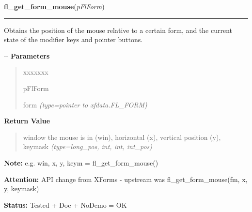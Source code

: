 \hspace{.8\funcindent}\begin{boxedminipage}{\funcwidth}

    \raggedright \textbf{fl\_get\_form\_mouse}(\textit{pFlForm})

    \vspace{-1.5ex}

    \rule{\textwidth}{0.5\fboxrule}
\setlength{\parskip}{2ex}

Obtains the position of the mouse relative to a certain form, and
the current state of the modifier keys and pointer buttons.

-{}-
\setlength{\parskip}{1ex}
      \textbf{Parameters}
      \vspace{-1ex}

      \begin{quote}
        \begin{Ventry}{xxxxxxx}

          \item[pFlForm]


form
            {\it (type=pointer to xfdata.FL\_FORM)}

        \end{Ventry}

      \end{quote}

      \textbf{Return Value}
    \vspace{-1ex}

      \begin{quote}

window the mouse is in (win), horizontal (x), vertical
position (y), keymask
      {\it (type=long\_pos, int, int, int\_pos)}

      \end{quote}

\textbf{Note:} 
e.g. win, x, y, keym = fl\_get\_form\_mouse()


\textbf{Attention:} 
API change from XForms - upstream was
fl\_get\_form\_mouse(fm, x, y, keymask)


\textbf{Status:} 
Tested + Doc + NoDemo = OK


    \end{boxedminipage}

    \label{xformslib:flxbasic:fl_win_to_form}

    \vspace{0.5ex}

